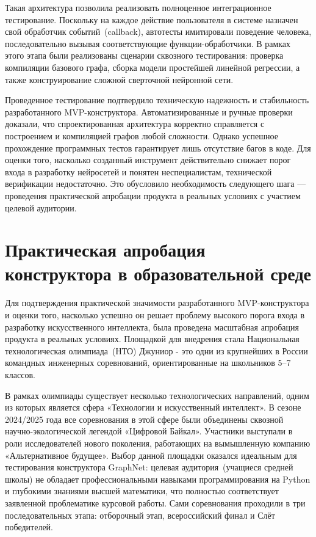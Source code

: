 \documentclass{report}
\begin{document}
Такая архитектура позволила реализовать полноценное интеграционное тестирование. Поскольку на каждое действие пользователя в системе назначен свой обработчик событий~(callback), автотесты имитировали поведение человека, последовательно вызывая соответствующие функции-обработчики. В рамках этого этапа были реализованы сценарии сквозного тестирования: проверка компиляции базового графа, сборка модели простейшей линейной регрессии, а также конструирование сложной сверточной нейронной сети.

Проведенное тестирование подтвердило техническую надежность и стабильность разработанного MVP-конструктора. Автоматизированные и ручные проверки доказали, что спроектированная архитектура корректно справляется с построением и компиляцией графов любой сложности. Однако успешное прохождение программных тестов гарантирует лишь отсутствие багов в коде. Для оценки того, насколько созданный инструмент действительно снижает порог входа в разработку нейросетей и понятен неспециалистам, технической верификации недостаточно. Это обусловило необходимость следующего шага — проведения практической апробации продукта в реальных условиях с участием целевой аудитории.


\section{Практическая апробация конструктора в образовательной среде}

Для подтверждения практической значимости разработанного MVP-конструктора и оценки того, насколько успешно он решает проблему высокого порога входа в разработку искусственного интеллекта, была проведена масштабная апробация продукта в реальных условиях. Площадкой для внедрения стала Национальная технологическая олимпиада~(НТО) Джуниор - это одни из крупнейших в России командных инженерных соревнований, ориентированные на школьников 5–7 классов.

В рамках олимпиады существует несколько технологических направлений, одним из которых является сфера «Технологии и искусственный интеллект». В сезоне 2024/2025 года все соревнования в этой сфере были объединены сквозной научно-экологической легендой «Цифровой Байкал». Участники выступали в роли исследователей нового поколения, работающих на вымышленную компанию «Альтернативное будущее». Выбор данной площадки оказался идеальным для тестирования конструктора GraphNet: целевая аудитория~(учащиеся средней школы) не обладает профессиональными навыками программирования на Python и глубокими знаниями высшей математики, что полностью соответствует заявленной проблематике курсовой работы. Сами соревнования проходили в три последовательных этапа: отборочный этап, всероссийский финал и Слёт победителей.
\end{document}
